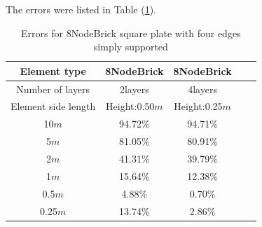 \documentclass[fleqn,11pt]{article}
\begin{document}
The errors were listed in Table (\ref{table Errors for 8NodeBrick square plate with four edges simply supported}).

\begin{table}[H]
  \centering
  \caption{Errors for 8NodeBrick square plate with four edges simply supported}
  \label{table Errors for 8NodeBrick square plate with four edges simply supported}
\begin{tabular}{|c|c|c|c|c|}
\hline
Element type        & 8NodeBrick     & 8NodeBrick      \\ \hline
Number of layers         & 2layers         & 4layers          \\ \hline
Element side length  & Height:0.50$m$ & Height:0.25$m$  \\ \hline
10$m$                & 94.72\% & 94.71\%        \\ \hline
5$m$                 & 81.05\% & 80.91\%        \\ \hline
2$m$                 & 41.31\% & 39.79\%        \\ \hline
1$m$                 & 15.64\% & 12.38\%        \\ \hline
0.5$m$               & 4.88\%  & 0.70\%         \\ \hline
0.25$m$              & 13.74\% & 2.86\%         \\
\hline
\end{tabular}
\end{table}

\end{document}
